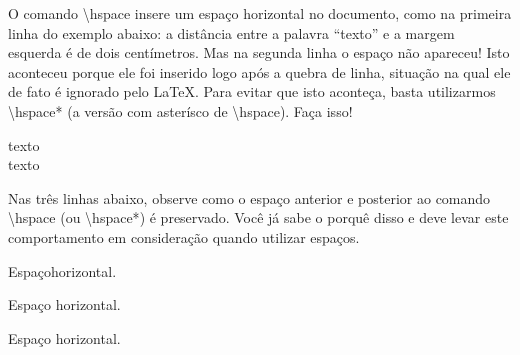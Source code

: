 \documentclass[a4paper,12pt]{article}
\newcommand{\comando}[1]{{\textbackslash\color{blue!70}\normalfont #1}}
\begin{document}
	
	
	O comando \comando{hspace} insere um espaço horizontal no documento, como na primeira linha do exemplo abaixo: a distância entre a palavra ``texto'' e a margem esquerda é de dois centímetros. Mas na segunda linha o espaço não apareceu! Isto aconteceu porque ele foi inserido logo após a quebra de linha, situação na qual ele de fato é ignorado pelo \LaTeX. Para evitar que isto aconteça, basta utilizarmos \comando{hspace*} (a versão com asterísco de \comando{hspace}). Faça isso!
	
	\noindent\hspace{2cm}texto\\ %
	         \hspace{2cm}texto   %
		       
	Nas três linhas abaixo, observe como o espaço anterior e posterior ao comando \comando{hspace} (ou \comando{hspace*}) é preservado. Você já sabe o porquê disso e deve levar este comportamento em consideração quando utilizar espaços.	          
	
	Espaço\hspace{1cm}horizontal.\par
	Espaço \hspace{1cm}horizontal.\par
	Espaço \hspace{1cm} horizontal.
		
\end{document}
